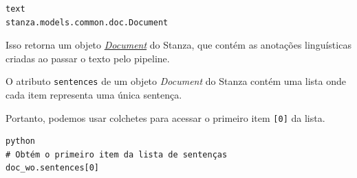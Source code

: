 \documentclass[
  brazilian,
]{article}
\begin{document}
\begin{verbatim}
text
stanza.models.common.doc.Document
\end{verbatim}

Isso retorna um objeto
\href{https://stanfordnlp.github.io/stanza/data_objects.html\#document}{\emph{Document}}
do Stanza, que contém as anotações linguísticas criadas ao passar o
texto pelo pipeline.

O atributo \texttt{sentences} de um objeto \emph{Document} do Stanza
contém uma lista onde cada item representa uma única sentença.

Portanto, podemos usar colchetes para acessar o primeiro item
\texttt{{[}0{]}} da lista.

\begin{verbatim}
python
# Obtém o primeiro item da lista de sentenças
doc_wo.sentences[0]
\end{verbatim}
\end{document}
